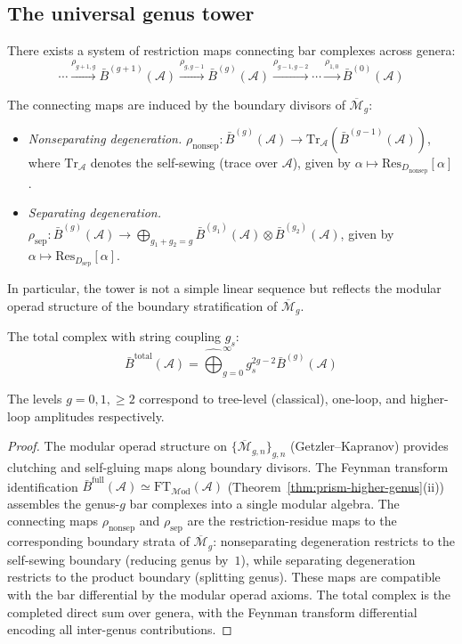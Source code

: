 \subsection{The universal genus tower}\label{subsec:universal-tower}

\begin{theorem}\label{thm:master-tower}
There exists a system of restriction maps connecting bar complexes across genera:
\[\cdots \xrightarrow{\rho_{g+1,g}} \bar{B}^{(g+1)}(\mathcal{A}) \xrightarrow{\rho_{g,g-1}} \bar{B}^{(g)}(\mathcal{A}) \xrightarrow{\rho_{g-1,g-2}} \cdots \xrightarrow{\rho_{1,0}} \bar{B}^{(0)}(\mathcal{A})\]

The connecting maps are induced by the boundary divisors of $\overline{\mathcal{M}}_g$:
\begin{itemize}
\item \emph{Nonseparating degeneration.} $\rho_{\text{nonsep}}: \bar{B}^{(g)}(\mathcal{A}) \to \mathrm{Tr}_{\mathcal{A}}(\bar{B}^{(g-1)}(\mathcal{A}))$, where $\mathrm{Tr}_{\mathcal{A}}$ denotes the self-sewing (trace over $\mathcal{A}$), given by $\alpha \mapsto \text{Res}_{D_{\text{nonsep}}}[\alpha]$.
\item \emph{Separating degeneration.} $\rho_{\text{sep}}: \bar{B}^{(g)}(\mathcal{A}) \to \bigoplus_{g_1+g_2=g} \bar{B}^{(g_1)}(\mathcal{A}) \otimes \bar{B}^{(g_2)}(\mathcal{A})$, given by $\alpha \mapsto \text{Res}_{D_{\text{sep}}}[\alpha]$.
\end{itemize}
In particular, the tower is not a simple linear sequence but reflects the modular operad structure of the boundary stratification of $\overline{\mathcal{M}}_g$.

The total complex with string coupling $g_s$:
\[\bar{B}^{\text{total}}(\mathcal{A}) = \widehat{\bigoplus}_{g=0}^\infty g_s^{2g-2} \bar{B}^{(g)}(\mathcal{A})\]

The levels $g=0,1,\geq 2$ correspond to tree-level (classical), one-loop, and higher-loop amplitudes respectively.
\end{theorem}

\begin{proof}
The modular operad structure on $\{\overline{\mathcal{M}}_{g,n}\}_{g,n}$ (Getzler--Kapranov) provides clutching and self-gluing maps along boundary divisors.  The Feynman transform identification $\bar{B}^{\mathrm{full}}(\mathcal{A}) \simeq \mathrm{FT}_{\mathcal{M}\mathrm{od}}(\mathcal{A})$ (Theorem~\ref{thm:prism-higher-genus}(ii)) assembles the genus-$g$ bar complexes into a single modular algebra.  The connecting maps $\rho_{\mathrm{nonsep}}$ and $\rho_{\mathrm{sep}}$ are the restriction-residue maps to the corresponding boundary strata of $\overline{\mathcal{M}}_g$: nonseparating degeneration restricts to the self-sewing boundary (reducing genus by~$1$), while separating degeneration restricts to the product boundary (splitting genus).  These maps are compatible with the bar differential by the modular operad axioms.  The total complex is the completed direct sum over genera, with the Feynman transform differential encoding all inter-genus contributions.
\end{proof}

